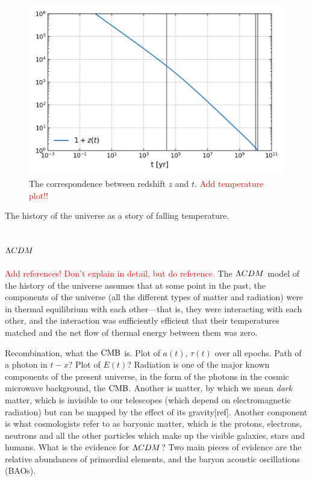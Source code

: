 \begin{figure}[!pth]
\centering     %
    \includegraphics[width=.75\columnwidth]{plots/lcdm_z.png}
\caption{
    The correspondence between redshift $z$ and $t$.
    \textcolor{red}{Add temperature plot!!}
}\label{fig:lcdm_z}
\end{figure}

\newpage
    The history of the universe as a story of falling temperature.
\newpage
    \subsection{$\Lambda CDM$}
    \textcolor{red}{Add references! Don't explain in detail, but do reference.}
    The $\Lambda CDM$ model of the history of the universe assumes that at some point in the
    past, the components of the universe (all the different types of matter and radiation)
    were in thermal equilibrium with each other---that is, they were interacting with each other,
    and the interaction was sufficiently efficient that their temperatures matched
    and the net flow of thermal energy between them was zero.


    Recombination, what the $\text{CMB}$ is.
    Plot of $a(t)$, $\tau(t)$ over all epochs.
    Path of a photon in $t-x$? Plot of $E(t)$?
\newpage
    Radiation is one of the major known components of the present universe, in the form of the
    photons in the cosmic microwave background, the $\text{CMB}$. Another is matter, by which we mean \textit{dark} matter,
    which is invisible to our telescopes (which depend on electromagnetic radiation) but can be mapped by the
    effect of its gravity[ref]. Another component is what cosmologists refer to as baryonic matter, which is
    the protons, electrons, neutrons and all the other particles which make up the visible galaxies, stars
    and humans.
\newpage
    What is the evidence for $\Lambda CDM$? Two main pieces of evidence are the relative abundances of
    primordial elements, and the baryon acoustic oscillations (BAOs).


